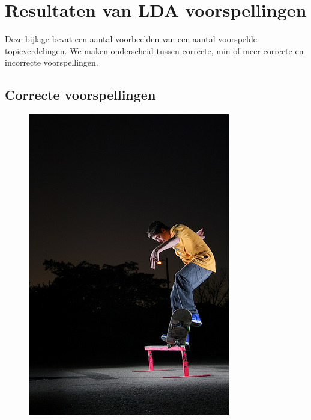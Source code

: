 \chapter{Resultaten van LDA voorspellingen}
\label{app:LDApredictions}
Deze bijlage bevat een aantal voorbeelden van een aantal voorspelde topicverdelingen. We maken onderscheid tussen correcte, min of meer correcte en incorrecte voorspellingen.
\section{Correcte voorspellingen}
\begin{figure}[h]
    \centering
    \begin{minipage}[t]{.5\linewidth}
    \centering
    \vspace{0pt}
    \includegraphics[width=\textwidth]{Images/LDA/2902844125.jpg}

\end{minipage}
\end{figure}

